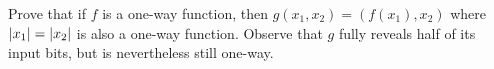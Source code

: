 \documentclass[12pt,letterpaper,boxed]{amspset}
\begin{document}
\begin{problem}[6.1]
Prove that if $f$ is a one-way function, then $g(x_1,x_2) = (f(x_1),x_2)$ where $\lvert x_1\rvert = \lvert x_2\rvert$ is also a one-way function. Observe that $g$ fully reveals half of its input bits, but is nevertheless still one-way.
\end{problem}

\begin{solution}


\vspace{5cm}
\end{solution}



\end{document}
